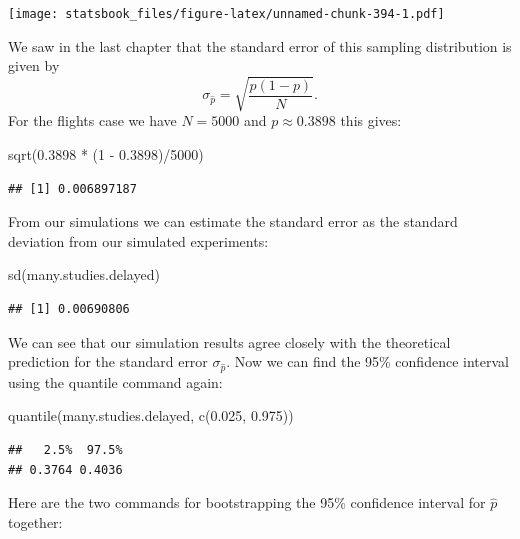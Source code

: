 \documentclass[
]{book}
\newenvironment{Shaded}{\begin{snugshade}}{\end{snugshade}}
\newcommand{\DecValTok}[1]{\textcolor[rgb]{0.00,0.00,0.81}{#1}}
\newcommand{\FloatTok}[1]{\textcolor[rgb]{0.00,0.00,0.81}{#1}}
\newcommand{\FunctionTok}[1]{\textcolor[rgb]{0.00,0.00,0.00}{#1}}
\newcommand{\NormalTok}[1]{#1}
\newcommand{\SpecialCharTok}[1]{\textcolor[rgb]{0.00,0.00,0.00}{#1}}
\theoremstyle{definition}
\theoremstyle{definition}
\theoremstyle{definition}
\theoremstyle{definition}
\theoremstyle{remark}
\begin{document}
\texttt{[image: statsbook\_files/figure-latex/unnamed-chunk-394-1.pdf]}

We saw in the last chapter that the standard error of this sampling distribution is given by \[\sigma_{\hat{p}}=\sqrt{\frac{p(1-p)}{N}}.\] For the flights case we have \(N=5000\) and \(p \approx 0.3898\) this gives:

\begin{Shaded}
\begin{Highlighting}[]
\FunctionTok{sqrt}\NormalTok{(}\FloatTok{0.3898} \SpecialCharTok{*}\NormalTok{ (}\DecValTok{1} \SpecialCharTok{{-}} \FloatTok{0.3898}\NormalTok{)}\SpecialCharTok{/}\DecValTok{5000}\NormalTok{)}
\end{Highlighting}
\end{Shaded}

\begin{verbatim}
## [1] 0.006897187
\end{verbatim}

From our simulations we can estimate the standard error as the standard deviation from our simulated experiments:

\begin{Shaded}
\begin{Highlighting}[]
\FunctionTok{sd}\NormalTok{(many.studies.delayed)}
\end{Highlighting}
\end{Shaded}

\begin{verbatim}
## [1] 0.00690806
\end{verbatim}

We can see that our simulation results agree closely with the theoretical prediction for the standard error \(\sigma_{\hat{p}}\). Now we can find the 95\% confidence interval using the quantile command again:

\begin{Shaded}
\begin{Highlighting}[]
\FunctionTok{quantile}\NormalTok{(many.studies.delayed, }\FunctionTok{c}\NormalTok{(}\FloatTok{0.025}\NormalTok{, }\FloatTok{0.975}\NormalTok{))}
\end{Highlighting}
\end{Shaded}

\begin{verbatim}
##   2.5%  97.5% 
## 0.3764 0.4036
\end{verbatim}

Here are the two commands for bootstrapping the 95\% confidence interval for \(\hat{p}\) together:
\end{document}
